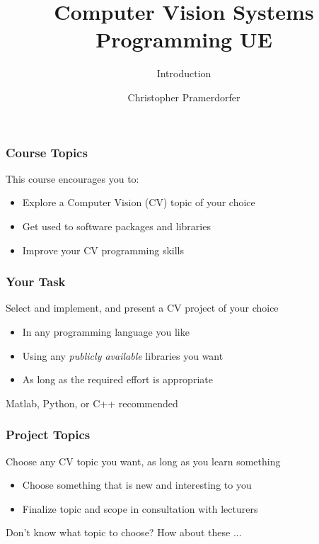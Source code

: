 \documentclass[xetex]{beamer}
\title{Computer Vision Systems Programming UE}
\subtitle{Introduction}
\author{Christopher Pramerdorfer}
\institute{Computer Vision Lab, Vienna University of Technology}
\begin{document}

\begin{frame}
\maketitle
\end{frame}


\begin{frame}
\frametitle{Course Topics}

This course encourages you to:
\begin{itemize}
	\item Explore a Computer Vision (CV) topic of your choice
	\item Get used to software packages and libraries
	\item Improve your CV programming skills
\end{itemize}

\end{frame}


\begin{frame}
\frametitle{Your Task}

Select and implement, and present a CV project of your choice
\begin{itemize}
	\item In any programming language you like
	\item Using any \emph{publicly available} libraries you want
	\item As long as the required effort is appropriate
\end{itemize}

\bigskip
Matlab, Python, or C++ recommended

\end{frame}


\begin{frame}
\frametitle{Project Topics}

Choose any CV topic you want, as long as you learn something
\begin{itemize}
	\item Choose something that is new and interesting to you
	\item Finalize topic and scope in consultation with lecturers
\end{itemize}

\bigskip
Don't know what topic to choose? How about these ...

\end{frame}
\end{document}
